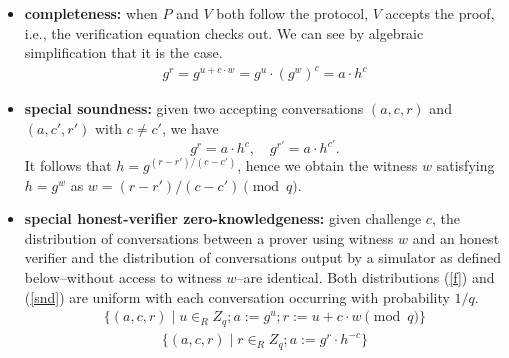 \documentclass[sigconf, anonymous]{acmart}
\begin{document}
\begin{itemize}
  \item \textbf{completeness:} when $P$ and $V$ both follow the protocol, $V$ accepts the proof, i.e., 
  the verification equation checks out. We can see by algebraic simplification that it is the case.
    \begin{align*}
      g^r = g^{u + c \cdot w} = g^u \cdot (g^w)^c = a \cdot h^c
    \end{align*}
  \item \textbf{special soundness:} given two accepting 
  conversations $(a, c, r)$ and $(a, c', r')$ with $c \neq c'$,
  we have 
  \[ g^r = a \cdot h^c, \quad g^{r'} = a \cdot h^{c'}. \]
  It follows that $h = g^{(r-r')/(c-c')}$, hence we obtain
  the witness $w$ satisfying $h=g^w$ as $w = (r - r')/(c - c') \pmod q$.

  \item \textbf{special honest-verifier zero-knowledgeness:}
   given challenge $c$, the distribution of conversations between a prover using
   witness $w$ and an honest verifier and the distribution of conversations output by a
   simulator as defined below--without access to witness $w$--are identical. Both
   distributions (\ref{f}) and (\ref{snd}) are uniform with each conversation occurring 
   with probability $1/q$.
   \begin{align}\label{f}
    \{(a, c, r) \mid u \in_{R} Z_q ; a := g^u; r := u + c \cdot w \pmod q \}
   \end{align}
   \begin{align}\label{snd}
    \{(a, c, r) \mid r \in_{R} Z_q ; a := g^r \cdot h^{-c}\}
   \end{align}
   
\end{itemize}
\end{document}
